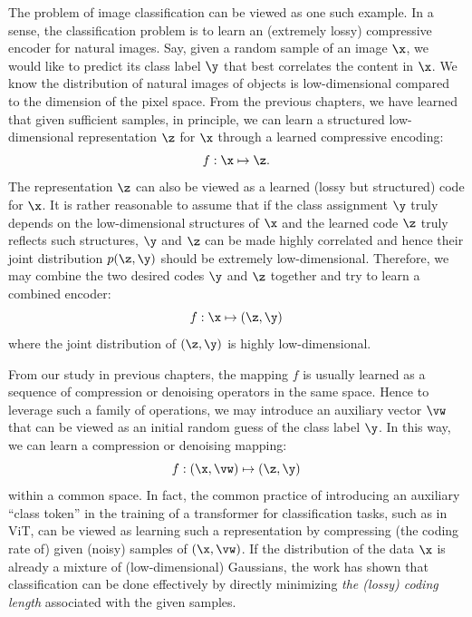 \documentclass[../../book-main.tex]{subfiles}
\begin{document}
The problem of image classification can be viewed as one such example. In a sense, the classification problem is to learn an (extremely lossy) compressive encoder for natural images. Say, given a random sample of an image $\x$, we would like to predict its class label $\y$ that best correlates the content in $\x$. We know the distribution of natural images of objects is low-dimensional compared to the dimension of the pixel space. From the previous chapters, we have learned that given sufficient samples, in principle, we can learn a structured low-dimensional representation $\z$ for $\x$ through a learned compressive encoding:
\begin{equation}
    f: \x \mapsto \z. 
\end{equation}
The representation $\z$ can also be viewed as a learned (lossy but structured) code for $\x$. It is rather reasonable to assume that if the class assignment $\y$ truly depends on the low-dimensional structures of $\x$ and the learned code $\z$ truly reflects such structures, $\y$ and $\z$ can be made highly correlated and hence their joint distribution $p(\z, \y)$ should be extremely low-dimensional. Therefore, we may combine the two desired codes $\y$ and $\z$ together and try to learn a combined encoder:
\begin{equation}
    f: \x \mapsto (\z, \y) 
\end{equation}
where the joint distribution of $(\z, \y)$ is highly low-dimensional. 

From our study in previous chapters, the mapping $f$ is usually learned as a sequence of compression or denoising operators in the same space. Hence to leverage such a family of operations, we may introduce an auxiliary vector $\vw$ that can be viewed as an initial random guess of the class label $\y$. In this way, we can learn a compression or denoising mapping:
\begin{equation}\label{eq:classifier-with-class-token}
    f: (\x, \vw) \mapsto (\z, \y)
\end{equation}
within a common space. In fact, the common practice of introducing an auxiliary ``class token'' in the training of a transformer for classification tasks, such as in ViT, can be viewed as learning such a representation by compressing (the coding rate of) given (noisy) samples of $(\x, \vw)$. If the distribution of the data $\x$ is already a mixture of (low-dimensional) Gaussians, the work \cite{wright2008classification} has shown that classification can be done effectively by directly minimizing {\em the (lossy) coding length} associated with the given samples.
\end{document}
